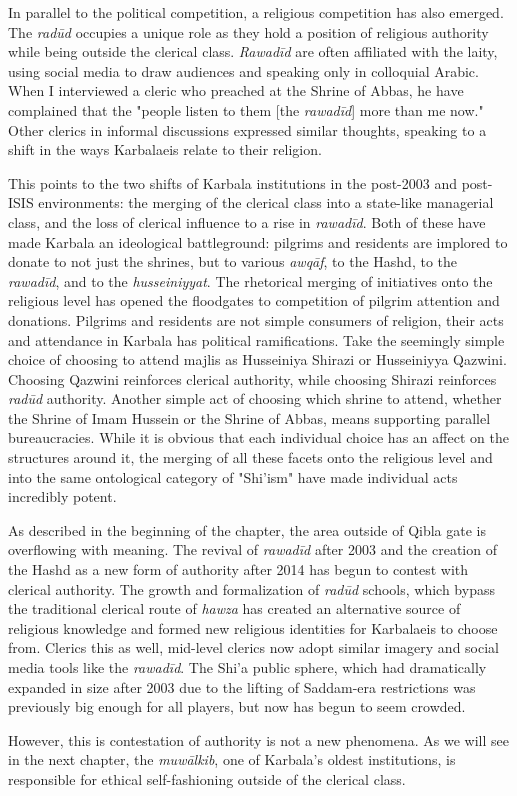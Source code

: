 In parallel to the political competition, a religious competition has also emerged. The \emph{radūd} occupies a unique role as they hold a position of religious authority while being outside the clerical class. \emph{Rawadīd} are often affiliated with the laity, using social media to draw audiences and speaking only in colloquial Arabic. When I interviewed a cleric who preached at the Shrine of Abbas, he have complained that the "people listen to them [the \emph{rawadīd}] more than me now." Other clerics in informal discussions expressed similar thoughts, speaking to a shift in the ways Karbalaeis relate to their religion. 

This points to the two shifts of Karbala institutions in the post-2003 and post-ISIS environments: the merging of the clerical class into a state-like managerial class, and the loss of clerical influence to a rise in \emph{rawadīd}. Both of these have made Karbala an ideological battleground: pilgrims and residents are implored to donate to not just the shrines, but to various \emph{awqāf}, to the Hashd, to the \emph{rawadīd}, and to the \emph{husseiniyyat}. The rhetorical merging of initiatives onto the religious level has opened the floodgates to competition of pilgrim attention and donations. Pilgrims and residents are not simple consumers of religion, their acts and attendance in Karbala has political ramifications. Take the seemingly simple choice of choosing to attend majlis as Husseiniya Shirazi or Husseiniyya Qazwini. Choosing Qazwini reinforces clerical authority, while choosing Shirazi reinforces \emph{radūd} authority. Another simple act of choosing which shrine to attend, whether the Shrine of Imam Hussein or the Shrine of Abbas, means supporting parallel bureaucracies. While it is obvious that each individual choice has an affect on the structures around it, the merging of all these facets onto the religious level and into the same ontological category of "Shi'ism" have made individual acts incredibly potent. 

As described in the beginning of the chapter, the area outside of Qibla gate is overflowing with meaning. The revival of \emph{rawadīd} after 2003 and the creation of the Hashd as a new form of authority after 2014 has begun to contest with clerical authority. The growth and formalization of \emph{radūd} schools, which bypass the traditional clerical route of \emph{hawza} has created an alternative source of religious knowledge and formed new religious identities for Karbalaeis to choose from. Clerics this as well, mid-level clerics now adopt similar imagery and social media tools like the \emph{rawadīd}. The Shi'a public sphere, which had dramatically expanded in size after 2003 due to the lifting of Saddam-era restrictions was previously big enough for all players, but now has begun to seem crowded. 

However, this is contestation of authority is not a new phenomena. As we will see in the next chapter, the \emph{muwālkib}, one of Karbala's oldest institutions, is responsible for ethical self-fashioning outside of the clerical class. 